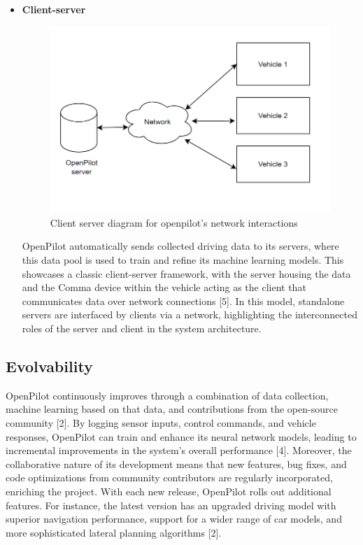 \documentclass[12pt]{article}
\begin{document}
\begin{itemize}
         \item[] \textbf{Client-server}
         \begin{figure}[ht]
        \centering
            \includegraphics[scale=0.7]{Assets/clientserver.png}
            \caption{Client server diagram for openpilot's network interactions}
            \label{fig:enter-label}
        \end{figure}

        OpenPilot automatically sends collected driving data to its servers, where this data pool is used to train and refine its machine learning models. This showcases a classic client-server framework, with the server housing the data and the Comma device within the vehicle acting as the client that communicates data over network connections [5]. In this model, standalone servers are interfaced by clients via a network, highlighting the interconnected roles of the server and client in the system architecture.
    \end{itemize}



\subsection{Evolvability}

    OpenPilot continuously improves through a combination of data collection, machine learning based on that data, and contributions from the open-source community [2]. By logging sensor inputs, control commands, and vehicle responses, OpenPilot can train and enhance its neural network models, leading to incremental improvements in the system's overall performance [4]. Moreover, the collaborative nature of its development means that new features, bug fixes, and code optimizations from community contributors are regularly incorporated, enriching the project. With each new release, OpenPilot rolls out additional features. For instance, the latest version has an upgraded driving model with superior navigation performance, support for a wider range of car models, and more sophisticated lateral planning algorithms [2].
    
\end{document}
